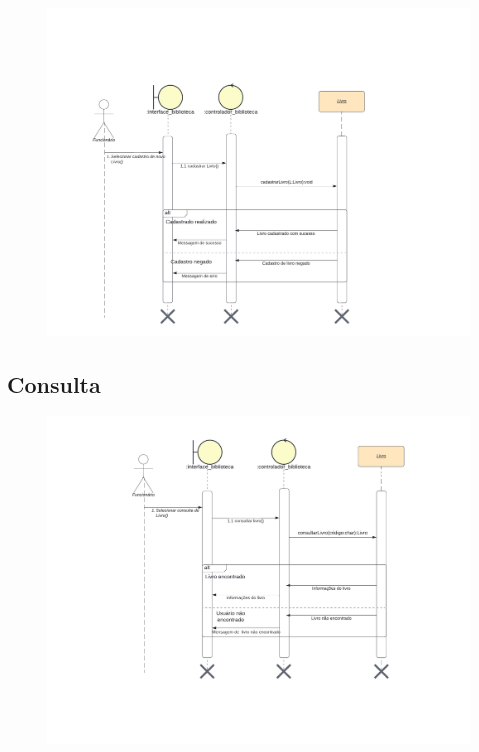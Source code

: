 \begin{figure}[h]
    \centering
    \includegraphics[width=1.0\linewidth]{Imagens/CadastrarLivro-sequencia.pdf}
\end{figure}

\newpage

\subsection{Consulta}

\begin{figure}[h]
    \centering
    \includegraphics[width=1.0\linewidth]{Imagens/ConsultarLivro-sequência.pdf}
\end{figure}

